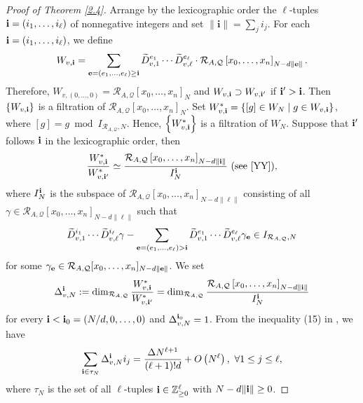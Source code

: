 \documentclass[12pt,leqno]{amsart}
\numberwithin{equation}{section}
\begin{document}
\begin{proof}[Proof of Theorem \ref{2.4}]
Arrange by the lexicographic order the $\ell$-tuples ${\bf i}=\left(i_1, \ldots, i_{\ell}\right)$ of nonnegative integers and set $\|\mathbf{i}\|=\sum_j i_j$. For each ${\bf i}=\left(i_1, \ldots, i_{\ell}\right)$, we define
$$W_{v,{\bf i}}=\sum_{{\bf e}=(e_1,\ldots,e_\ell)\geq {\bf i}} \widetilde{D}_{v,1}^{e_1} \cdots \widetilde{D}_{v,\ell}^{e_{\ell}} \cdot \mathcal{R}_{A, \mathcal{Q}}\left[x_0, \ldots, x_n\right]_{N-d\|{\bf e}\|} .$$
Therefore, $W_{v,(0, \ldots, 0)}=\mathcal{R}_{A, \mathcal{Q}}\left[x_0, \ldots, x_n\right]_N$ and $W_{v,{\bf i}} \supset W_{v,{\bf i}'}$ if ${\bf i}'>{\bf i}$. Then $\left\{W_{v,{\bf i}}\right\}$ is a filtration of $\mathcal{R}_{A, \mathcal{Q}}\left[x_0, \ldots, x_n\right]_N$. Set $W_{v,{\bf i}}^*=\left\{[g] \in W_N \mid g \in W_{v,{\bf i}}\right\}$, where $[g]=g \bmod I_{\mathcal{R}_{A, \mathcal{Q}}, N}$. Hence, $\left\{W_{v,{\bf i}}^*\right\}$ is a filtration of $W_N$. Suppose that ${\bf i}'$ follows ${\bf i}$ in the lexicographic order, then
$$\frac{W_{v,{\bf i}}^*}{W_{v,{\bf i}'}^*} \simeq \frac{\mathcal{R}_{A, \mathcal{Q}}\left[x_0, \ldots, x_n\right]_{N-d\|{\bf i}\|}}{I_N^{{\bf i}}} \text { (see \cite[Lemma 3.8]{YY}),}$$
where $I^{{\bf i}}_{N}$ is the subspace of  $\mathcal R_{A,\mathcal Q}[x_{0}, \ldots, x_{n}]_{N-d\|\ell\|}$ consisting of all $\gamma \in \mathcal R_{A,\mathcal Q}[x_{0}, \ldots, x_{n}]_{N-d\|\ell\|}$ such that
$$\widetilde{D}_{v,1}^{i_{1}}\cdots\widetilde{D}_{v,\ell}^{i_{\ell}}\gamma -\sum_{{\bf e}=(e_{1},\ldots,e_{\ell}) > {\bf i}}\widetilde{D}_{v,1}^{e_{1}}\cdots\widetilde{D}_{v,\ell}^{e_{\ell}}\gamma_{{\bf e}}\in I_{\mathcal R_{A,\mathcal Q},N}$$
for some $\gamma_{\bf e}\in\mathcal R_{A,\mathcal Q}[x_0,\ldots,x_n]_{N-d\|{\bf e}\|}$. We set
$$\Delta_{v,N}^{{\bf i}}:=\dim_{\mathcal{R}_{A, \mathcal{Q}}} \frac{W_{v,{\bf i}}^*}{W_{v,{\bf i}'}^*}=\dim_{\mathcal{R}_{A, \mathcal{Q}}} \frac{\mathcal{R}_{A, \mathcal{Q}}\left[x_0, \ldots, x_n\right]_{N-d\|{\bf i}\|}}{I_N^{{\bf i}}}$$
for every ${\bf i}<{\bf i}_0=(N/d,0,\ldots,0)$ and $\Delta_{v,N}^{{\bf i}_0}=1$.
From the inequality (15) in \cite{JYY}, we have
\begin{align}\label{2.11}
\sum_{{\bf i} \in \tau_N} \Delta_{v,N}^{\bf i}i_j=\frac{\Delta N^{\ell+1}}{(\ell+1)!d}+O\left(N^{\ell}\right),\ \forall 1\le j\le \ell,
\end{align}
where $\tau_N$ is the set of all $\ell$-tuples ${\bf i} \in \mathbb{Z}_{\geq 0}^{\ell}$ with $N-d\|{\bf i}\| \geq 0$.


\end{proof}
\end{document}
